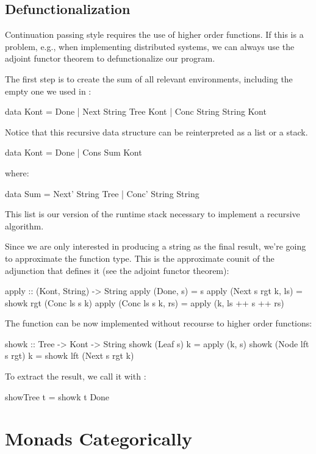 \documentclass[DaoFP]{subfiles}
\begin{document}
\subsection{Defunctionalization}

Continuation passing style requires the use of higher order functions. If this is a problem, e.g., when implementing distributed systems, we can always use the adjoint functor theorem to defunctionalize our program. 

The first step is to create the sum of all relevant environments, including the empty one we used in :
\begin{haskell}
data Kont = Done 
          | Next String Tree Kont 
          | Conc String String Kont
\end{haskell}
Notice that this recursive data structure can be reinterpreted as a list or a stack. 
\begin{haskell}
data Kont = Done | Cons Sum Kont
\end{haskell}
where:
\begin{haskell}
data Sum = Next' String Tree  | Conc' String String 
\end{haskell}
This list is our version of the runtime stack necessary to implement a recursive algorithm. 

Since we are only interested in producing a string as the final result, we're going to approximate the  function type. This is the approximate counit of the adjunction that defines it (see the adjoint functor theorem):
\begin{haskell}
apply :: (Kont, String) -> String
apply (Done, s) = s
apply (Next s rgt k, ls) = showk rgt (Conc ls s k)
apply (Conc ls s k, rs) = apply (k, ls ++ s ++ rs)
\end{haskell}

The  function can be now implemented without recourse to higher order functions:
\begin{haskell}
showk :: Tree -> Kont -> String
showk (Leaf s) k = apply (k, s)
showk (Node lft s rgt) k = showk lft (Next s rgt k)
\end{haskell}
To extract the result, we call it with :
\begin{haskell}
showTree t = showk t Done
\end{haskell}

\section{Monads Categorically}
\end{document}
